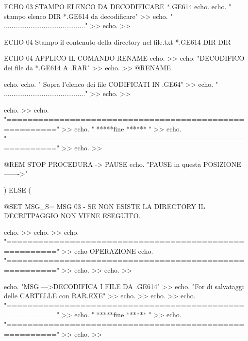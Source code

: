 \documentclass[10pt,a4paper]{book}
\begin{document}
{			
			ECHO  03 STAMPO ELENCO DA DECODIFICARE *.GE614 %
			echo.
			echo. " stampo elenco DIR *.GE614 da decodificare"				>> %
			echo. " ..........................................."				>> %
			echo.										>> %
			
			
			ECHO  04 Stampo il contenuto della directory nel file.txt *.GE614 %
			DIR %
			DIR %
			
			
			
			ECHO 04 APPLICO IL COMANDO RENAME  %
			echo.										>> %
			echo. "DECODIFICO dei file da *.GE614 A .RAR"					>> %
			echo.										>> %
			@RENAME %
			
			
			
			echo.
			echo. " Sopra l'elenco dei file CODIFICATI IN .GE64"				>> %
			echo. " ..........................................."				>> %
			echo.										>> %
			
			echo.										>> %
			echo. "======================================================="			>> %
			echo. "                  *****fine ******                     "			>> %
			echo. "======================================================="			>> %
			echo.										>> %
			
			@REM STOP PROCEDURA ->  PAUSE echo. "PAUSE in questa POSIZIONE ------->" 
			
			) ELSE (
			
			@SET MSG_S= MSG 03 - SE NON ESISTE LA DIRECTORY  IL DECRITPAGGIO NON VIENE ESEGUITO.
			
			echo.										>> %
			echo.										>> %
			echo. "======================================================="			>> %
			echo   OPERAZIONE %
			echo. "======================================================="			>> %
			echo.										>> %
			echo.										>> %
			
			echo. "MSG --->DECODIFICA I FILE DA .GE614"					>> %
			echo. "For di salvataggi delle CARTELLE con RAR.EXE"				>> %
			echo.										>> %
			echo.										>> %
			echo. "======================================================="			>> %
			echo. "                  *****fine ******                     "			>> %
			echo. "======================================================="			>> %
			echo.										>> %
			
}
\end{document}
